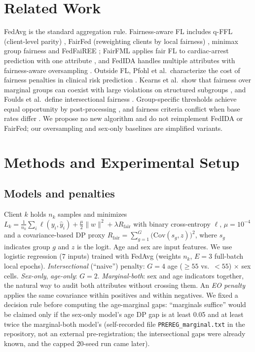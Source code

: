 \documentclass[conference]{IEEEtran}
\begin{document}
\section{Related Work}
FedAvg \cite{mcmahan2017} is the standard aggregation rule. Fairness-aware FL includes q-FFL (client-level parity) \cite{li2020qffl}, FairFed (reweighting clients by local fairness) \cite{ezzeldin2023}, minimax group fairness \cite{papadaki2022} and FedFaiREE \cite{yin2024}; FairFML applies fair FL to cardiac-arrest prediction with one attribute \cite{li2025fairfml}, and FedIDA handles multiple attributes with fairness-aware oversampling \cite{wu2025fedida}. Outside FL, Pfohl et al.\ characterize the cost of fairness penalties in clinical risk prediction \cite{pfohl2019,pfohl2021}. Kearns et al.\ show that fairness over marginal groups can coexist with large violations on structured subgroups \cite{kearns2018}, and Foulds et al.\ define intersectional fairness \cite{foulds2020}. Group-specific thresholds achieve equal opportunity by post-processing \cite{hardt2016}, and fairness criteria conflict when base rates differ \cite{chouldechova2017,kleinberg2017}. We propose no new algorithm and do not reimplement FedIDA or FairFed; our oversampling and sex-only baselines are simplified variants.

\section{Methods and Experimental Setup}
\subsection{Models and penalties}
\label{sec:penalty}
Client $k$ holds $n_k$ samples and minimizes $L_k=\frac1{n_k}\sum_i\ell(y_i,\hat y_i)+\frac{\mu}{2}\|w\|^2+\lambda R_{\mathrm{fair}}$ with binary cross-entropy $\ell$, $\mu=10^{-4}$ and a covariance-based DP proxy \cite{zafar2017} $R_{\mathrm{fair}}=\sum_{g=1}^{G}\big(\mathrm{Cov}(s_g,z)\big)^2$, where $s_g$ indicates group $g$ and $z$ is the logit. Age and sex are input features. We use logistic regression (7 inputs) trained with FedAvg (weights $n_k$, $E{=}3$ full-batch local epochs). \emph{Intersectional} (``naive'') penalty: $G{=}4$ age ($\ge55$ vs.\ $<55$) $\times$ sex cells. \emph{Sex-only}, \emph{age-only}: $G{=}2$. \emph{Marginal-both}: sex and age indicators together, the natural way to audit both attributes without crossing them. An \emph{EO penalty} applies the same covariance within positives and within negatives. We fixed a decision rule before computing the age-marginal gaps: ``marginals suffice'' would be claimed only if the sex-only model's age DP gap is at least 0.05 and at least twice the marginal-both model's (self-recorded file \texttt{PREREG\_marginal.txt} in the repository, not an external pre-registration; the intersectional gaps were already known, and the capped 20-seed run came later).
\end{document}
